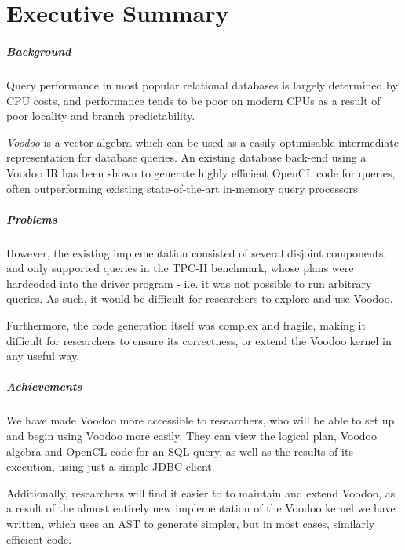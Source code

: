 \chapter{Executive Summary}

\paragraph{Background}

Query performance in most popular relational databases is largely determined by CPU costs, and performance tends to be poor on modern CPUs as a result of poor locality and branch predictability.

\emph{Voodoo} \cite{Pirk:2016:VVA:3007328.3007336} is a vector algebra which can be used as a easily optimisable intermediate representation for database queries. An existing database back-end using a Voodoo IR has been shown to generate highly efficient OpenCL code for queries, often outperforming existing state-of-the-art in-memory query processors.

\paragraph{Problems}

However, the existing implementation consisted of several disjoint components, and only supported queries in the TPC-H benchmark, whose plans were hardcoded into the driver program - i.e. it was not possible to run arbitrary queries. As such, it would be difficult for researchers to explore and use Voodoo.

Furthermore, the code generation itself was complex and fragile, making it difficult for researchers to ensure its correctness, or extend the Voodoo kernel in any useful way.

\paragraph{Achievements}

We have made Voodoo more accessible to researchers, who will be able to set up and begin using Voodoo more easily. They can view the logical plan, Voodoo algebra and OpenCL code for an SQL query, as well as the results of its execution, using just a simple JDBC client.

Additionally, researchers will find it easier to to maintain and extend Voodoo, as a result of the almost entirely new implementation of the Voodoo kernel we have written, which uses an AST to generate simpler, but in most cases, similarly efficient code.

